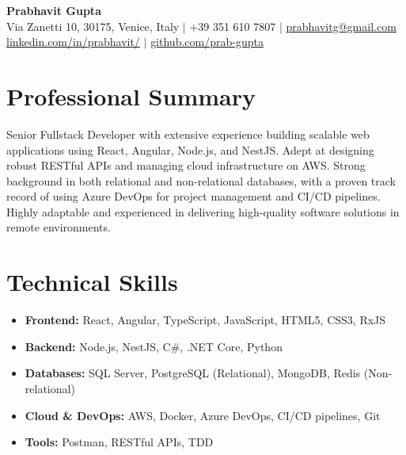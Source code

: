 \documentclass[11pt,a4paper]{article}
\begin{document}
\begin{center}
    {\Huge \textbf{Prabhavit Gupta}} \\
    \vspace{2mm}
    Via Zanetti 10, 30175, Venice, Italy $\vert$ +39 351 610 7807 $\vert$ \href{mailto:prabhavitg@gmail.com}{prabhavitg@gmail.com} \\
    \href{https://www.linkedin.com/in/prabhavit/}{linkedin.com/in/prabhavit/} $\vert$ \href{https://github.com/prab-gupta}{github.com/prab-gupta}
\end{center}

\vspace{5mm}
\section*{Professional Summary}
Senior Fullstack Developer with extensive experience building scalable web applications using React, Angular, Node.js, and NestJS. Adept at designing robust RESTful APIs and managing cloud infrastructure on AWS. Strong background in both relational and non-relational databases, with a proven track record of using Azure DevOps for project management and CI/CD pipelines. Highly adaptable and experienced in delivering high-quality software solutions in remote environments.

\section*{Technical Skills}
\begin{itemize}[leftmargin=*]
    \item \textbf{Frontend:} React, Angular, TypeScript, JavaScript, HTML5, CSS3, RxJS
    \item \textbf{Backend:} Node.js, NestJS, C\#, .NET Core, Python
    \item \textbf{Databases:} SQL Server, PostgreSQL (Relational), MongoDB, Redis (Non-relational)
    \item \textbf{Cloud \& DevOps:} AWS, Docker, Azure DevOps, CI/CD pipelines, Git
    \item \textbf{Tools:} Postman, RESTful APIs, TDD
\end{itemize}
\end{document}
